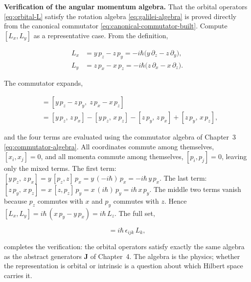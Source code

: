 \medskip\noindent\textbf{Verification of the angular momentum algebra.}
That the orbital operators \eqref{eq:orbital-L} satisfy the rotation algebra \eqref{eq:galilei-algebra} is proved directly from the canonical commutator \eqref{eq:canonical-commutator-built}. Compute $[L_x, L_y]$ as a representative case. From the definition,
\begin{linenomath}
  \begin{align}
    L_x &= y\,p_z - z\,p_y = -i\hbar\bigl(y\,\partial_z - z\,\partial_y\bigr), \nonumber\\
    L_y &= z\,p_x - x\,p_z = -i\hbar\bigl(z\,\partial_x - x\,\partial_z\bigr).
  \end{align}
\end{linenomath}
The commutator expands,
\begin{linenomath}
  \begin{align}
    [L_x, L_y] &= [y\,p_z - z\,p_y,\; z\,p_x - x\,p_z] \nonumber\\
    &= [y\,p_z,\,z\,p_x] - [y\,p_z,\,x\,p_z] - [z\,p_y,\,z\,p_x] + [z\,p_y,\,x\,p_z],
  \end{align}
\end{linenomath}
and the four terms are evaluated using the commutator algebra of Chapter~3 \eqref{eq:commutator-algebra}. All coordinates commute among themselves, $[x_i, x_j] = 0$, and all momenta commute among themselves, $[p_i, p_j] = 0$, leaving only the mixed terms. The first term: $[y\,p_z,\,z\,p_x] = y\,[p_z,z]\,p_x = y\,(-i\hbar)\,p_x = -i\hbar\,y\,p_x$. The last term: $[z\,p_y,\,x\,p_z] = x\,[z,p_z]\,p_y = x\,(i\hbar)\,p_y = i\hbar\,x\,p_y$. The middle two terms vanish because $p_z$ commutes with $x$ and $p_y$ commutes with $z$. Hence $[L_x, L_y] = i\hbar\,(x\,p_y - y\,p_x) = i\hbar\,L_z$. The full set,
\begin{linenomath}
  \begin{equation}
    [L_i, L_j] = i\hbar\,\epsilon_{ijk}\,L_k,
  \end{equation}
\end{linenomath}
completes the verification: the orbital operators satisfy exactly the same algebra as the abstract generators $\bm J$ of Chapter~4. The algebra is the physics; whether the representation is orbital or intrinsic is a question about which Hilbert space carries it.

